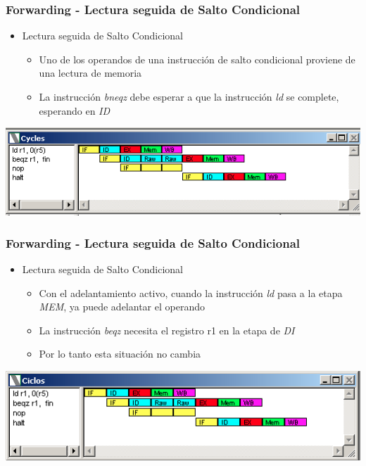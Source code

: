 \documentclass{beamer}
\begin{document}
\begin{frame}[fragile]
\frametitle{Forwarding - Lectura seguida de Salto Condicional}
\begin{itemize}
\item Lectura seguida de Salto Condicional
\begin{itemize}
\item Uno de los operandos de una instrucción de salto condicional proviene de una lectura de memoria
\item La instrucción \emph{bneqz} debe esperar a que la instrucción \emph{ld} se complete, esperando en \emph{ID}
\end{itemize}
\end{itemize}
\includegraphics[scale=0.45]{forwarding-3.png}
\end{frame}

\begin{frame}[fragile]
\frametitle{Forwarding - Lectura seguida de Salto Condicional}
\begin{itemize}
\item Lectura seguida de Salto Condicional
\begin{itemize}
\item Con el adelantamiento activo, cuando la instrucción \emph{ld} pasa a la etapa \emph{MEM}, ya puede adelantar el operando
\item La instrucción \emph{beqz} necesita el registro r1 en la etapa de \emph{DI}
\item Por lo tanto esta situación no cambia
\end{itemize}
\end{itemize}
\includegraphics[scale=0.45]{forwarding-3-lectura-beq.png}
\end{frame}
\end{document}
